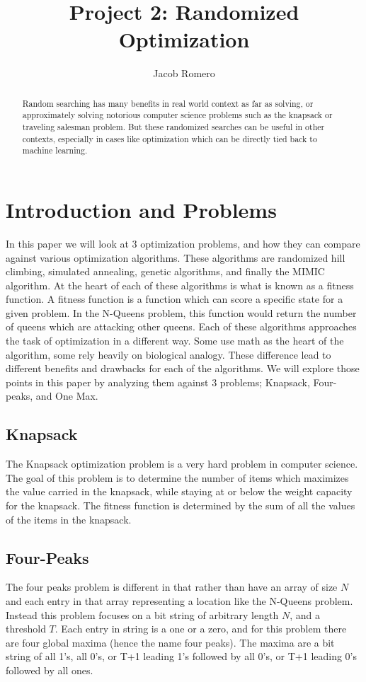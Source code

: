 \documentclass[
letterpaper, %
]{IEEEtran}
\author{Jacob Romero}
\title{Project 2: Randomized Optimization}
\begin{document}
	\maketitle
	
	\begin{abstract}
		Random searching has many benefits in real world context as far as solving, or approximately solving notorious computer science problems such as the knapsack or traveling salesman problem. But these randomized searches can be useful in other contexts, especially in cases like optimization which can be directly tied back to machine learning.
	\end{abstract}
	
	\section{Introduction and Problems}
	In this paper we will look at 3 optimization problems, and how they can compare against various optimization algorithms. These algorithms are randomized hill climbing, simulated annealing, genetic algorithms, and finally the MIMIC algorithm. At the heart of each of these algorithms is what is known as a fitness function. A fitness function is a function which can score a specific state for a given problem. In the N-Queens problem, this function would return the number of queens which are attacking other queens. Each of these algorithms approaches the task of optimization in a different way. Some use math as the heart of the algorithm, some rely heavily on biological analogy. These difference lead to different benefits and drawbacks for each of the algorithms. We will explore those points in this paper by analyzing them against 3 problems; Knapsack,  Four-peaks, and One Max.
	
	\subsection{Knapsack}
	The Knapsack optimization problem is a very hard problem in computer science. The goal of this problem is to determine the number of items which maximizes the value carried in the knapsack, while staying at or below the weight capacity for the knapsack. The fitness function is determined by the sum of all the values of the items in the knapsack.
	
	\subsection{Four-Peaks}
	The four peaks problem is different in that rather than have an array of size $N$ and each entry in that array representing a location like the N-Queens problem. Instead this problem focuses on a bit string of arbitrary length $N$, and a threshold $T$. Each entry in string is a one or a zero, and for this problem there are four global maxima (hence the name four peaks). The maxima are a bit string of all 1's, all 0's, or T+1 leading 1's followed by all 0's, or T+1 leading 0's followed by all ones.
	
\end{document}
